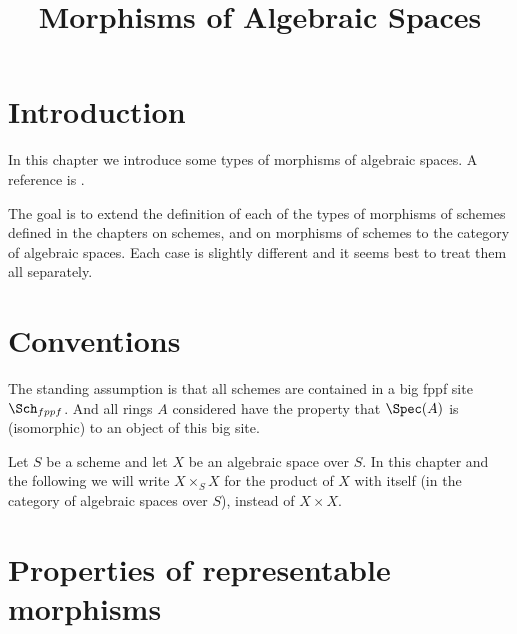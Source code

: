 

%


\title{Morphisms of Algebraic Spaces}


\maketitle

\label{section-phantom}

\tableofcontents

\section{Introduction}
\label{section-introduction}

\noindent
In this chapter we introduce some types of morphisms of algebraic spaces.
A reference is \cite{Kn}.

\medskip\noindent
The goal is to extend the definition of each of the types of morphisms of
schemes defined in the chapters on schemes, and on morphisms of schemes
to the category of algebraic spaces. Each case is slightly different and
it seems best to treat them all separately.





\section{Conventions}
\label{section-conventions}

\noindent
The standing assumption is that all schemes are contained in
a big fppf site $\Sch_{fppf}$. And all rings $A$ considered
have the property that $\Spec(A)$ is (isomorphic) to an
object of this big site.

\medskip\noindent
Let $S$ be a scheme and let $X$ be an algebraic space over $S$.
In this chapter and the following we will write $X \times_S X$
for the product of $X$ with itself (in the category of algebraic
spaces over $S$), instead of $X \times X$.





\section{Properties of representable morphisms}
\label{section-representable}

